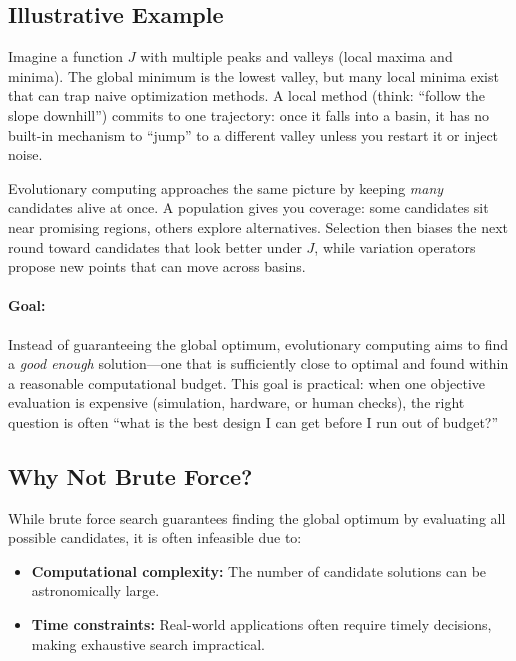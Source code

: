 \subsection{Illustrative Example}
\label{sec:evo_illustrative_example}

Imagine a function \( J \) with multiple peaks and valleys (local maxima and minima). The global minimum is the lowest valley, but many local minima exist that can trap naive optimization methods. A local method (think: ``follow the slope downhill'') commits to one trajectory: once it falls into a basin, it has no built-in mechanism to ``jump'' to a different valley unless you restart it or inject noise.

Evolutionary computing approaches the same picture by keeping \emph{many} candidates alive at once. A population gives you coverage: some candidates sit near promising regions, others explore alternatives. Selection then biases the next round toward candidates that look better under \(J\), while variation operators propose new points that can move across basins.

\paragraph{Goal:} Instead of guaranteeing the global optimum, evolutionary computing aims to find a \emph{good enough} solution---one that is sufficiently close to optimal and found within a reasonable computational budget. This goal is practical: when one objective evaluation is expensive (simulation, hardware, or human checks), the right question is often ``what is the best design I can get before I run out of budget?''

\subsection{Why Not Brute Force?}
\label{sec:evo_why_not_brute_force}

While brute force search guarantees finding the global optimum by evaluating all possible candidates, it is often infeasible due to:

\begin{itemize}
    \item \textbf{Computational complexity:} The number of candidate solutions can be astronomically large.
    \item \textbf{Time constraints:} Real-world applications often require timely decisions, making exhaustive search impractical.
\end{itemize}

